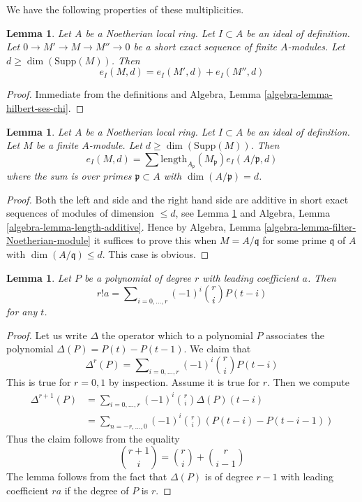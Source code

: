 \documentclass{stacks-project}
\theoremstyle{plain}
\newtheorem{lemma}[subsection]{Lemma}
\theoremstyle{definition}
\theoremstyle{remark}
\numberwithin{equation}{subsection}
\begin{document}
\noindent
We have the following properties of these multiplicities.

\begin{lemma}
\label{lemma-multiplicity-ses}
Let $A$ be a Noetherian local ring. Let $I \subset A$ be an ideal of
definition. Let $0 \to M' \to M \to M'' \to 0$ be a short exact sequence
of finite $A$-modules. Let $d \geq \dim(\text{Supp}(M))$. Then
$$
e_I(M, d) = e_I(M', d) + e_I(M'', d)
$$
\end{lemma}

\begin{proof}
Immediate from the definitions and
Algebra, Lemma \ref{algebra-lemma-hilbert-ses-chi}.
\end{proof}

\begin{lemma}
\label{lemma-multiplicity-as-a-sum}
Let $A$ be a Noetherian local ring. Let $I \subset A$ be an ideal of
definition. Let $M$ be a finite $A$-module. Let $d \geq \dim(\text{Supp}(M))$.
Then
$$
e_I(M, d) =
\sum \text{length}_{A_\mathfrak p}(M_\mathfrak p) e_I(A/\mathfrak p, d)
$$
where the sum is over primes $\mathfrak p \subset A$ with
$\dim(A/\mathfrak p) = d$.
\end{lemma}

\begin{proof}
Both the left and side and the right hand side are additive in short
exact sequences of modules of dimension $\leq d$, see
Lemma \ref{lemma-multiplicity-ses} and
Algebra, Lemma \ref{algebra-lemma-length-additive}.
Hence by Algebra, Lemma \ref{algebra-lemma-filter-Noetherian-module}
it suffices to prove this when $M = A/\mathfrak q$ for some
prime $\mathfrak q$ of $A$ with $\dim(A/\mathfrak q) \leq d$.
This case is obvious.
\end{proof}

\begin{lemma}
\label{lemma-leading-coefficient}
Let $P$ be a polynomial of degree $r$ with leading coefficient $a$.
Then
$$
r! a = \sum\nolimits_{i = 0, \ldots, r} (-1)^i{r \choose i} P(t - i)
$$
for any $t$.
\end{lemma}

\begin{proof}
Let us write $\Delta$ the operator which to a polynomial $P$ associates
the polynomial $\Delta(P) = P(t) - P(t - 1)$. We claim that
$$
\Delta^r(P) = \sum\nolimits_{i = 0, \ldots, r} (-1)^i {r \choose i} P(t - i)
$$
This is true for $r = 0, 1$ by inspection. Assume it is true for $r$.
Then we compute
\begin{align*}
\Delta^{r + 1}(P)
& =
\sum\nolimits_{i = 0, \ldots, r} (-1)^i {r \choose i} \Delta(P)(t - i) \\
& =
\sum\nolimits_{n = -r, \ldots, 0} (-1)^i {r \choose i}
(P(t - i) - P(t - i - 1))
\end{align*}
Thus the claim follows from the equality
$$
{r + 1 \choose i} = {r \choose i} + {r \choose i - 1}
$$
The lemma follows from the fact that $\Delta(P)$ is of degree $r - 1$
with leading coefficient $ra$ if the degree of $P$ is $r$.
\end{proof}
\end{document}
